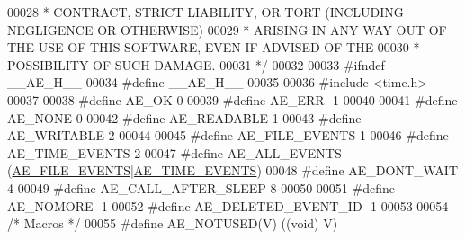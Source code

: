 \begin{DoxyCode}
00028 \textcolor{comment}{ * CONTRACT, STRICT LIABILITY, OR TORT (INCLUDING NEGLIGENCE OR OTHERWISE)}
00029 \textcolor{comment}{ * ARISING IN ANY WAY OUT OF THE USE OF THIS SOFTWARE, EVEN IF ADVISED OF THE}
00030 \textcolor{comment}{ * POSSIBILITY OF SUCH DAMAGE.}
00031 \textcolor{comment}{ */}
00032 
00033 \textcolor{preprocessor}{#}\textcolor{preprocessor}{ifndef} \textcolor{preprocessor}{\_\_AE\_H\_\_}
00034 \textcolor{preprocessor}{#}\textcolor{preprocessor}{define} \textcolor{preprocessor}{\_\_AE\_H\_\_}
00035 
00036 \textcolor{preprocessor}{#}\textcolor{preprocessor}{include} \textcolor{preprocessor}{<}\textcolor{preprocessor}{time}\textcolor{preprocessor}{.}\textcolor{preprocessor}{h}\textcolor{preprocessor}{>}
00037 
00038 \textcolor{preprocessor}{#}\textcolor{preprocessor}{define} \textcolor{preprocessor}{AE\_OK} 0
00039 \textcolor{preprocessor}{#}\textcolor{preprocessor}{define} \textcolor{preprocessor}{AE\_ERR} \textcolor{preprocessor}{-}1
00040 
00041 \textcolor{preprocessor}{#}\textcolor{preprocessor}{define} \textcolor{preprocessor}{AE\_NONE} 0
00042 \textcolor{preprocessor}{#}\textcolor{preprocessor}{define} \textcolor{preprocessor}{AE\_READABLE} 1
00043 \textcolor{preprocessor}{#}\textcolor{preprocessor}{define} \textcolor{preprocessor}{AE\_WRITABLE} 2
00044 
00045 \textcolor{preprocessor}{#}\textcolor{preprocessor}{define} \textcolor{preprocessor}{AE\_FILE\_EVENTS} 1
00046 \textcolor{preprocessor}{#}\textcolor{preprocessor}{define} \textcolor{preprocessor}{AE\_TIME\_EVENTS} 2
00047 \textcolor{preprocessor}{#}\textcolor{preprocessor}{define} \textcolor{preprocessor}{AE\_ALL\_EVENTS} \textcolor{preprocessor}{(}\hyperlink{ae_8h_ac3fe42c648aaa679f6bffaeb1f8f9ea8}{AE\_FILE\_EVENTS}\textcolor{preprocessor}{|}\hyperlink{ae_8h_acdc6c5c42302bc81959ed645b22800aa}{AE\_TIME\_EVENTS}\textcolor{preprocessor}{)}
00048 \textcolor{preprocessor}{#}\textcolor{preprocessor}{define} \textcolor{preprocessor}{AE\_DONT\_WAIT} 4
00049 \textcolor{preprocessor}{#}\textcolor{preprocessor}{define} \textcolor{preprocessor}{AE\_CALL\_AFTER\_SLEEP} 8
00050 
00051 \textcolor{preprocessor}{#}\textcolor{preprocessor}{define} \textcolor{preprocessor}{AE\_NOMORE} \textcolor{preprocessor}{-}1
00052 \textcolor{preprocessor}{#}\textcolor{preprocessor}{define} \textcolor{preprocessor}{AE\_DELETED\_EVENT\_ID} \textcolor{preprocessor}{-}1
00053 
00054 \textcolor{comment}{/* Macros */}
00055 \textcolor{preprocessor}{#}\textcolor{preprocessor}{define} \textcolor{preprocessor}{AE\_NOTUSED}\textcolor{preprocessor}{(}\textcolor{preprocessor}{V}\textcolor{preprocessor}{)} \textcolor{preprocessor}{(}\textcolor{preprocessor}{(}\textcolor{keywordtype}{void}\textcolor{preprocessor}{)} \textcolor{preprocessor}{V}\textcolor{preprocessor}{)}

\end{DoxyCode}
